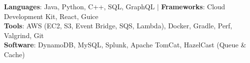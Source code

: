 \begin{center}
\textbf{Languages}: Java, Python, C++, SQL, GraphQL $|$ 
\textbf{Frameworks}: Cloud Development Kit, React, Guice\\
\textbf{Tools}: AWS (EC2, S3, Event Bridge, SQS, Lambda), Docker, Gradle, Perf, Valgrind, Git\\
\textbf{Software}: DynamoDB, MySQL, Splunk, Apache TomCat, HazelCast (Queue \& Cache)
\end{center}